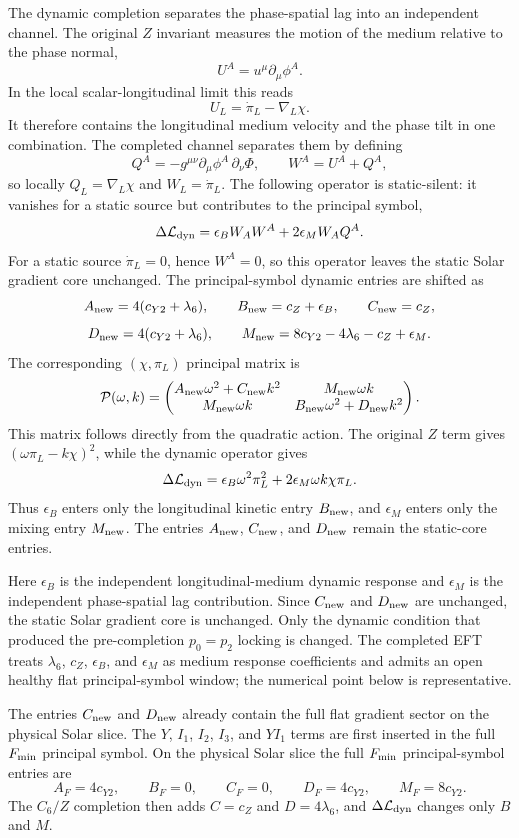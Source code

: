 \documentclass[12pt,a4paper]{article}
\begin{document}
The dynamic completion separates the phase-spatial lag into an independent
channel.  The original $Z$ invariant measures the motion of the medium
relative to the phase normal,
\[
U^A=u^\mu\partial_\mu\phi^A.
\]
In the local scalar-longitudinal limit this reads
\[
U_L=\dot\pi_L-\nabla_L\chi.
\]
It therefore contains the longitudinal medium velocity and the phase tilt in
one combination.  The completed channel separates them by defining
\[
Q^A=-g^{\mu\nu}\partial_\mu\phi^A\,\partial_\nu\Phi,\qquad
W^A=U^A+Q^A,
\]
so locally $Q_L=\nabla_L\chi$ and $W_L=\dot\pi_L$.  The following operator is
static-silent: it vanishes for a static source but contributes to the
principal symbol,
\[
\Delta\mathcal L_{\rm dyn}
=\epsilon_B W_A W^A+2\epsilon_M W_A Q^A.
\]
For a static source $\dot\pi_L=0$, hence $W^A=0$, so this operator leaves the
static Solar gradient core unchanged.  The principal-symbol dynamic entries
are shifted as
\[
A_{\rm new}=4(c_{Y2}+\lambda_6),\qquad
B_{\rm new}=c_Z+\epsilon_B,\qquad
C_{\rm new}=c_Z,
\]
\[
D_{\rm new}=4(c_{Y2}+\lambda_6),\qquad
M_{\rm new}=8c_{Y2}-4\lambda_6-c_Z+\epsilon_M.
\]
The corresponding $(\chi,\pi_L)$ principal matrix is
\[
\mathcal P(\omega,k)=
\begin{pmatrix}
A_{\rm new}\omega^2+C_{\rm new}k^2 & M_{\rm new}\omega k\\
M_{\rm new}\omega k & B_{\rm new}\omega^2+D_{\rm new}k^2
\end{pmatrix}.
\]
This matrix follows directly from the quadratic action.  The original $Z$ term gives
$(\omega\pi_L-k\chi)^2$, while the dynamic operator gives
\[
\Delta\mathcal L_{\rm dyn}
=\epsilon_B\omega^2\pi_L^2+2\epsilon_M\omega k\chi\pi_L.
\]
Thus $\epsilon_B$ enters only the longitudinal kinetic entry $B_{\rm new}$,
and $\epsilon_M$ enters only the mixing entry $M_{\rm new}$.  The entries
$A_{\rm new}$, $C_{\rm new}$, and $D_{\rm new}$ remain the static-core entries.

Here $\epsilon_B$ is the independent longitudinal-medium dynamic response and
$\epsilon_M$ is the independent phase-spatial lag contribution.  Since $C_{\rm
new}$ and $D_{\rm new}$ are unchanged, the static Solar gradient core is
unchanged.  Only the dynamic condition that produced the pre-completion $p_0=p_2$ locking is
changed.
The completed EFT treats $\lambda_6$, $c_Z$, $\epsilon_B$, and $\epsilon_M$ as
medium response coefficients and admits an open healthy flat principal-symbol
window; the numerical point below is representative.

The entries $C_{\rm new}$ and $D_{\rm new}$ already contain the full flat
gradient sector on the physical Solar slice. The $Y$, $I_1$, $I_2$, $I_3$,
and $YI_1$ terms are first inserted in the full $F_{\rm min}$ principal
symbol. On the physical Solar slice the full $F_{\rm min}$ principal-symbol
entries are
\[
A_F=4c_{Y2},\qquad B_F=0,\qquad C_F=0,\qquad
D_F=4c_{Y2},\qquad M_F=8c_{Y2}.
\]
The $C_6/Z$ completion then adds $C=c_Z$ and $D=4\lambda_6$, and
$\Delta\mathcal L_{\rm dyn}$ changes only $B$ and $M$.
\end{document}

